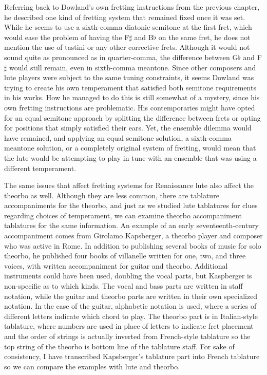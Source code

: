 Referring back to Dowland's own fretting instructions from the previous chapter,
he described one kind of fretting system that remained fixed once it was set.
While he seems to use a sixth-comma diatonic semitone at the first fret, which
would ease the problem of having the F$\sharp$ and B$\flat$ on the same fret, he
does not mention the use of tastini or any other corrective frets. Although it
would not sound quite as pronounced as in quarter-comma, the difference between
G$\flat$ and F$\sharp$ would still remain, even in sixth-comma
meantone. Since other composers and lute players were subject to the same tuning
constraints, it seems Dowland was trying to create his own temperament that
satisfied both semitone requirements in his works. How he managed to do this is
still somewhat of a mystery, since his own fretting instructions are
problematic. His contemporaries might have opted for an equal semitone approach
by splitting the difference between frets or opting for positions that simply
satisfied their ears. Yet, the ensemble dilemma would have remained, and
applying an equal semitone solution, a sixth-comma meantone solution, or a
completely original system of fretting, would mean that the lute would be
attempting to play in tune with an ensemble that was using a different
temperament.

The same issues that affect fretting systems for Renaissance lute also affect
the theorbo as well.  Although they are less common, there are tablature
accompaniments for the theorbo, and just as we studied lute tablatures for clues
regarding choices of temperament, we can examine theorbo accompaniment
tablatures for the same information. An example of an early seventeenth-century
accompaniment comes from Girolamo Kapsberger, a theorbo player and composer who
was active in Rome. In addition to publishing several books of music for solo
theorbo, he published four books of villanelle written for one, two, and
three voices, with written accompaniment for guitar and theorbo.  Additional
instruments could have been used, doubling the vocal parts, but Kaspberger is
non-specific as to which kinds.  The vocal and bass parts are written in
staff notation, while the guitar and theorbo parts are written in their own
specialized notation.  In the case of the guitar, alphabetic notation is used,
where a series of different letters indicate which chord to play. The theorbo
part is in Italian-style tablature, where numbers are used in place of letters
to indicate fret placement and the order of strings is actually inverted from
French-style tablature so the top string of the theorbo is bottom line of the
tablature staff.  For sake of consistency, I have transcribed Kapsberger's
tablature part into French tablature so we can compare the examples with lute
and theorbo.

